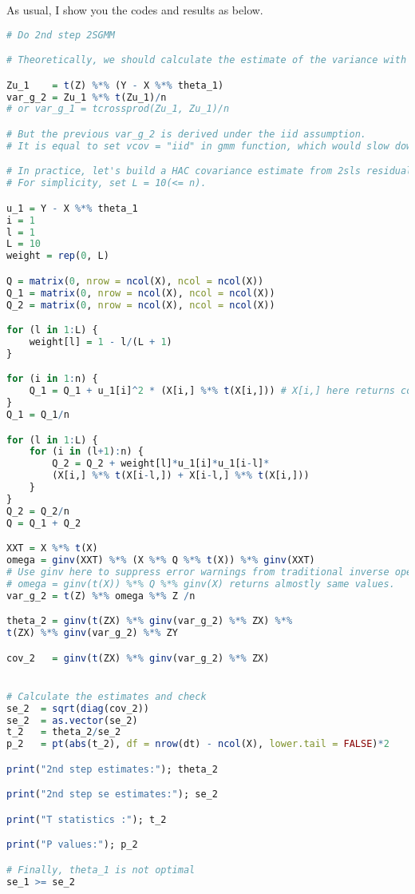 \documentclass{article}
\theoremstyle{definition}
\begin{document}
As usual, I show you the codes and results as below.
\begin{lstlisting}[language = R]
# Do 2nd step 2SGMM

# Theoretically, we should calculate the estimate of the variance with theta_1 by

Zu_1    = t(Z) %*% (Y - X %*% theta_1)
var_g_2 = Zu_1 %*% t(Zu_1)/n
# or var_g_1 = tcrossprod(Zu_1, Zu_1)/n

# But the previous var_g_2 is derived under the iid assumption. 
# It is equal to set vcov = "iid" in gmm function, which would slow down the calculation.

# In practice, let's build a HAC covariance estimate from 2sls residuals and X.
# For simplicity, set L = 10(<= n). 

u_1 = Y - X %*% theta_1
i = 1
l = 1
L = 10
weight = rep(0, L)

Q = matrix(0, nrow = ncol(X), ncol = ncol(X))
Q_1 = matrix(0, nrow = ncol(X), ncol = ncol(X))
Q_2 = matrix(0, nrow = ncol(X), ncol = ncol(X))

for (l in 1:L) {
	weight[l] = 1 - l/(L + 1)
}

for (i in 1:n) {
	Q_1 = Q_1 + u_1[i]^2 * (X[i,] %*% t(X[i,])) # X[i,] here returns column vector
}
Q_1 = Q_1/n

for (l in 1:L) {
	for (i in (l+1):n) {
		Q_2 = Q_2 + weight[l]*u_1[i]*u_1[i-l]*
		(X[i,] %*% t(X[i-l,]) + X[i-l,] %*% t(X[i,]))
	}
}
Q_2 = Q_2/n
Q = Q_1 + Q_2

XXT = X %*% t(X)
omega = ginv(XXT) %*% (X %*% Q %*% t(X)) %*% ginv(XXT)
# Use ginv here to suppress error warnings from traditional inverse operation.
# omega = ginv(t(X)) %*% Q %*% ginv(X) returns almostly same values.
var_g_2 = t(Z) %*% omega %*% Z /n

theta_2 = ginv(t(ZX) %*% ginv(var_g_2) %*% ZX) %*% 
t(ZX) %*% ginv(var_g_2) %*% ZY

cov_2   = ginv(t(ZX) %*% ginv(var_g_2) %*% ZX) 


# Calculate the estimates and check
se_2  = sqrt(diag(cov_2))
se_2  = as.vector(se_2)
t_2   = theta_2/se_2
p_2   = pt(abs(t_2), df = nrow(dt) - ncol(X), lower.tail = FALSE)*2

print("2nd step estimates:"); theta_2

print("2nd step se estimates:"); se_2

print("T statistics :"); t_2

print("P values:"); p_2

# Finally, theta_1 is not optimal
se_1 >= se_2
\end{lstlisting}
\end{document}
